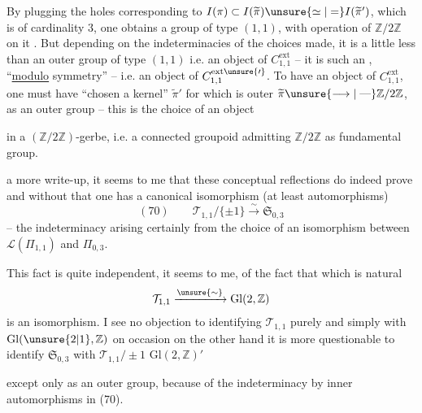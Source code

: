 By plugging the holes corresponding to $I(\pi)\subset I(\widetilde{\pi})\unsure{\simeq|=}I(\widetilde{\pi}')$, which is of cardinality $3$, one obtains a  group of type $(1,1)$, with operation of $\mathbb Z/2\mathbb Z$ on it . But depending on the indeterminacies of the choices made, it is a little less than an outer group of type $(1,1)$ i.e. an object of $C^{\mathrm{ext}}_{1,1}$ -- it is such an , ``\uline{modulo} symmetry'' -- i.e. an object of $C^{\mathrm{ext}\unsure{\prime}}_{1,1}$. To have an object of $C^{\mathrm{ext}}_{1,1}$, one must have ``chosen a kernel'' $\widetilde{\pi}'$ for  which is outer $\widetilde{\pi}\unsure{\longrightarrow|\mathrel{\text{---}}}\mathbb Z/2\mathbb Z$, as an outer group -- this is the choice of an object


in a $(\mathbb Z/2\mathbb Z)$-gerbe, i.e.  a connected groupoid admitting $\mathbb Z/2\mathbb Z$ as fundamental group.

 a more  write-up, it seems to me that these conceptual reflections do indeed prove and without  that one has a canonical isomorphism (at least   automorphisms)
\[
(70)\qquad \mathcal T_{1,1}/\{\pm1\}\xrightarrow{\sim}\mathfrak S_{0,3}
\]
-- the indeterminacy  arising  certainly from the choice of an isomorphism between $\mathcal L(\Pi_{1,1})$ and $\Pi_{0,3}$.

This fact is quite independent,  it seems to me, of the fact that  which is natural
\[
\mathcal T_{1,1}\xrightarrow{\unsure{\sim}}\mathrm{Gl}(2,\mathbb Z)
\]
is an isomorphism. I see no objection to identifying $\mathcal T_{1,1}$ purely and simply with $\mathrm{Gl}(\unsure{2|1},\mathbb Z)$ on occasion\unsure{,|;} on the other hand it is more questionable to identify $\mathfrak S_{0,3}$ with $\mathcal T_{1,1}/\pm1$  $\mathrm{Gl}(2,\mathbb Z)'$


except only as an outer group, because of the indeterminacy by inner automorphisms in (70).

